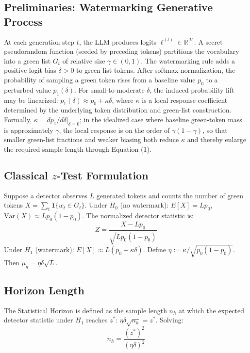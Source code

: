 \documentclass[11pt]{article}
\begin{document}
\subsection{Preliminaries: Watermarking Generative Process}
At each generation step $t$, the LLM produces logits $\ell^{(t)} \in
\mathbb{R}^{|V|}$. A secret pseudorandom function (seeded by preceding tokens)
partitions the vocabulary into a green list $G_t$ of relative size $\gamma \in
(0,1)$. The watermarking rule adds a positive logit bias $\delta > 0$ to green-list
tokens. After softmax normalization, the probability of sampling a green token rises
from a baseline value $p_0$ to a perturbed value $p_1(\delta)$. For
small-to-moderate $\delta$, the induced probability lift may be linearized:
$p_1(\delta) \approx p_0 + \kappa\delta$, where $\kappa$ is a local response
coefficient determined by the underlying token distribution and green-list
construction. Formally, $\kappa = dp_1/d\delta|_{\delta=0}$; in the idealized case
where baseline green-token mass is approximately $\gamma$, the local response is on
the order of $\gamma(1-\gamma)$, so that smaller green-list fractions and weaker
biasing both reduce $\kappa$ and thereby enlarge the required sample length through
Equation (1).
\subsection{Classical \texorpdfstring{$z$}{z}-Test Formulation}
Suppose a detector observes $L$ generated tokens and counts the number of green
tokens $X = \sum_t \mathbf{1}\{w_t \in G_t\}$. Under $H_0$ (no watermark):
$E[X] = Lp_0$, $\mathrm{Var}(X) \approx Lp_0(1-p_0)$. The normalized detector
statistic is:
\begin{equation}
Z = \frac{X - Lp_0}{\sqrt{Lp_0(1-p_0)}}
\end{equation}
Under $H_1$ (watermark): $E[X] \approx L(p_0 + \kappa\delta)$. Define $\eta :=
\kappa/\sqrt{p_0(1-p_0)}$. Then $\mu_g = \eta\delta\sqrt{L}$.
\subsection{Horizon Length}
The Statistical Horizon is defined as the sample length $n_h$ at which the expected
detector statistic under $H_1$ reaches $z^*$: $\eta\delta\sqrt{n_h} = z^*$. Solving:
\begin{equation}
n_h = \frac{(z^*)^2}{(\eta\delta)^2}
\end{equation}
\end{document}
